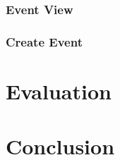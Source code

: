 \documentclass[12pt, draft]{report}
\begin{document}
	\subsection{Event View}


	\subsection{Create Event}

	\chapter{Evaluation}

	\chapter{Conclusion}

	\printbibliography

	\printglossaries
\end{document}
